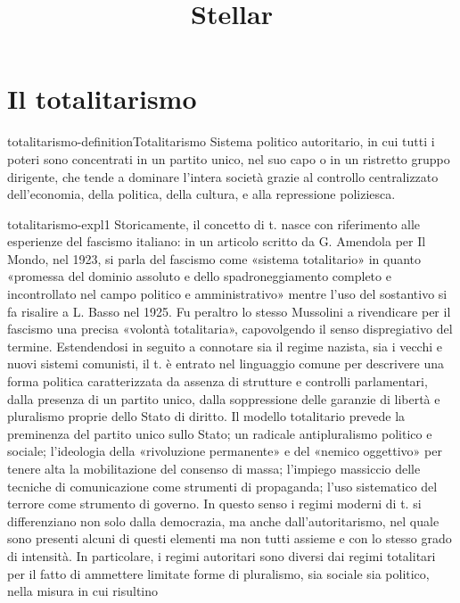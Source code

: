 \documentclass[preview]{standalone}
\begin{document}
\title{Stellar}
\genpage

\section{Il totalitarismo}

\begin{snippetdefinition}{totalitarismo-definition}{Totalitarismo}
    Sistema politico autoritario, in cui tutti i poteri sono concentrati in un partito unico, nel suo
    capo o in un ristretto gruppo dirigente, che tende a dominare l'intera società grazie al controllo
    centralizzato dell'economia, della politica, della cultura, e alla repressione poliziesca.
\end{snippetdefinition}

\begin{snippet}{totalitarismo-expl1}
    Storicamente, il concetto di t. nasce con riferimento alle esperienze del fascismo italiano: in un
    articolo scritto da G. Amendola per Il Mondo, nel 1923, si parla del fascismo come «sistema
    totalitario» in quanto «promessa del dominio assoluto e dello spadroneggiamento completo e
    incontrollato nel campo politico e amministrativo» mentre l'uso del sostantivo si fa risalire a L.
    Basso nel 1925. Fu peraltro lo stesso Mussolini a rivendicare per il fascismo una precisa
    «volontà totalitaria», capovolgendo il senso dispregiativo del termine. Estendendosi in seguito
    a connotare sia il regime nazista, sia i vecchi e nuovi sistemi comunisti, il t. è entrato nel
    linguaggio comune per descrivere una forma politica caratterizzata da assenza di strutture e
    controlli parlamentari, dalla presenza di un partito unico, dalla soppressione delle garanzie di
    libertà e pluralismo proprie dello Stato di diritto. Il modello totalitario prevede la preminenza
    del partito unico sullo Stato; un radicale antipluralismo politico e sociale; l'ideologia della
    «rivoluzione permanente» e del «nemico oggettivo» per tenere alta la mobilitazione del
    consenso di massa; l'impiego massiccio delle tecniche di comunicazione come strumenti
    di propaganda; l'uso sistematico del terrore come strumento di governo. In questo senso i
    regimi moderni di t. si differenziano non solo dalla democrazia, ma anche dall'autoritarismo,
    nel quale sono presenti alcuni di questi elementi ma non tutti assieme e con lo stesso grado di
    intensità. In particolare, i regimi autoritari sono diversi dai regimi totalitari per il fatto di
    ammettere limitate forme di pluralismo, sia sociale sia politico, nella misura in cui risultino

\end{snippet}
\end{document}
